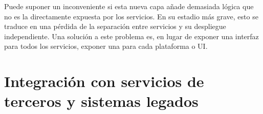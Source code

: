 \documentclass[11pt,a4paper]{article}
\begin{document}
Puede suponer un inconveniente si esta nueva capa añade demasiada lógica que no es la directamente expuesta por los servicios. En su estadio más grave, esto se traduce en una pérdida de la separación entre servicios y su despliegue independiente. Una solución a este problema es, en lugar de exponer una interfaz para todos los servicios, exponer una para cada plataforma o UI.

\part{Integración con servicios de terceros y sistemas legados}
\end{document}
